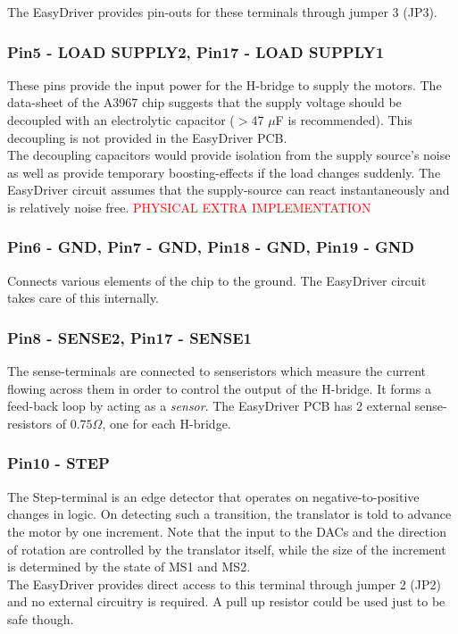 \documentclass{article}
\newcommand{\xxx}[1]{\textcolor{red}{#1}}
\theoremstyle{plain}
\theoremstyle{definition}
\theoremstyle{remark}
\begin{document}
The EasyDriver provides pin-outs for these terminals through jumper 3 (JP3).

\subsubsection*{Pin5 - LOAD SUPPLY2, Pin17 - LOAD SUPPLY1}
These pins provide the input power for the H-bridge to supply the motors. The data-sheet of the A3967 chip suggests that the supply voltage should be decoupled with an electrolytic capacitor ($>$47 $\mu$F is recommended). This decoupling is not provided in the EasyDriver PCB.\\

The decoupling capacitors would provide isolation from the supply source's noise as well as provide temporary boosting-effects if the load changes suddenly. The EasyDriver circuit assumes that the supply-source can react instantaneously and is relatively noise free.
\xxx{PHYSICAL EXTRA IMPLEMENTATION}

\subsubsection*{Pin6 - GND, Pin7 - GND, Pin18 - GND, Pin19 - GND}
Connects various elements of the chip to the ground. The EasyDriver circuit takes care of this internally.

\subsubsection*{Pin8 - SENSE2, Pin17 - SENSE1}
The sense-terminals are connected to senseristors which measure the current flowing across them in order to control the output of the H-bridge. It forms a feed-back loop by acting as a \emph{sensor}. The EasyDriver PCB has 2 external sense-resistors of $0.75\Omega$, one for each H-bridge.

\subsubsection*{Pin10 - STEP}
The Step-terminal is an edge detector that operates on negative-to-positive changes in logic. On detecting such a transition, the  translator is told to advance the motor by one increment. Note that the input to the DACs and the direction of rotation are controlled by the translator itself, while the size of the increment is determined by the state of MS1  and MS2.\\

The EasyDriver provides direct access to this terminal through jumper 2 (JP2) and no external circuitry is required. A pull up resistor could be used just to be safe though.
\end{document}
